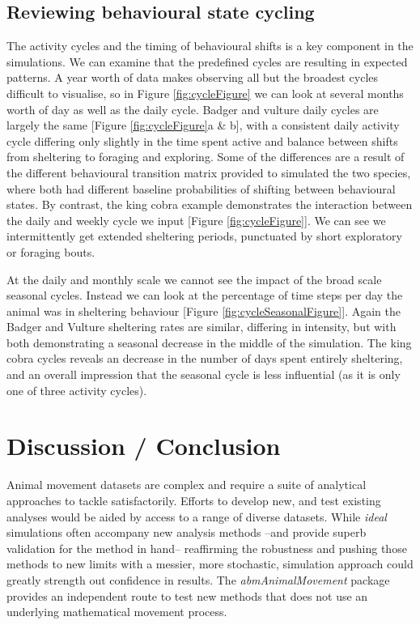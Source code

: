 \documentclass[10pt,a4paper]{article}
\begin{document}
\hypertarget{reviewing-behavioural-state-cycling}{%
\subsection{Reviewing behavioural state cycling}\label{reviewing-behavioural-state-cycling}}

The activity cycles and the timing of behavioural shifts is a key component in the simulations.
We can examine that the predefined cycles are resulting in expected patterns.
A year worth of data makes observing all but the broadest cycles difficult to visualise, so in Figure \ref{fig:cycleFigure} we can look at several months worth of day as well as the daily cycle.
Badger and vulture daily cycles are largely the same {[}Figure \ref{fig:cycleFigure}a \& b{]}, with a consistent daily activity cycle differing only slightly in the time spent active and balance between shifts from sheltering to foraging and exploring.
Some of the differences are a result of the different behavioural transition matrix provided to simulated the two species, where both had different baseline probabilities of shifting between behavioural states.
By contrast, the king cobra example demonstrates the interaction between the daily and weekly cycle we input {[}Figure \ref{fig:cycleFigure}{]}.
We can see we intermittently get extended sheltering periods, punctuated by short exploratory or foraging bouts.

At the daily and monthly scale we cannot see the impact of the broad scale seasonal cycles.
Instead we can look at the percentage of time steps per day the animal was in sheltering behaviour {[}Figure \ref{fig:cycleSeasonalFigure}{]}.
Again the Badger and Vulture sheltering rates are similar, differing in intensity, but with both demonstrating a seasonal decrease in the middle of the simulation.
The king cobra cycles reveals an decrease in the number of days spent entirely sheltering, and an overall impression that the seasonal cycle is less influential (as it is only one of three activity cycles).

\hypertarget{discussion-conclusion}{%
\section{Discussion / Conclusion}\label{discussion-conclusion}}

Animal movement datasets are complex and require a suite of analytical approaches to tackle satisfactorily.
Efforts to develop new, and test existing analyses would be aided by access to a range of diverse datasets.
While \emph{ideal} simulations often accompany new analysis methods --and provide superb validation for the method in hand-- reaffirming the robustness and pushing those methods to new limits with a messier, more stochastic, simulation approach could greatly strength out confidence in results.
The \emph{abmAnimalMovement} package provides an independent route to test new methods that does not use an underlying mathematical movement process.
\end{document}
